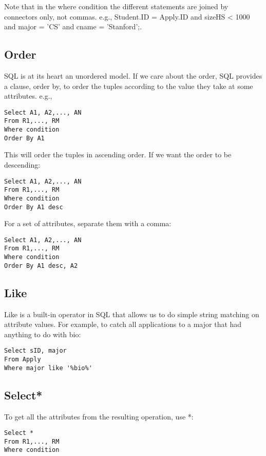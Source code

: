 \documentclass[11pt, oneside]{article}   	%
\begin{document}
Note that in the where condition the different statements are joined by connectors only, not commas. e.g.,
Student.ID = Apply.ID and sizeHS < 1000 and major = 'CS' and cname = 'Stanford';.

\subsection{Order}

SQL is at its heart an unordered model. If we care about the order, SQL provides a clause, order by, to order the tuples according to the value they take at some attributes. e.g.,

\begin{lstlisting}
Select A1, A2,..., AN
From R1,..., RM
Where condition
Order By A1
\end{lstlisting}

This will order the tuples in ascending order. If we want the order to be descending:

\begin{lstlisting}
Select A1, A2,..., AN
From R1,..., RM
Where condition
Order By A1 desc
\end{lstlisting}

For a set of attributes, separate them with a comma:

\begin{lstlisting}
Select A1, A2,..., AN
From R1,..., RM
Where condition
Order By A1 desc, A2 
\end{lstlisting}

\subsection{Like}

Like is a built-in operator in SQL that allows us to do simple string matching on attribute values. For example, to catch all applications to a major that had anything to do with bio:

\begin{lstlisting}
Select sID, major
From Apply
Where major like '%bio%'
\end{lstlisting}

\subsection{Select*}

To get all the attributes from the resulting operation, use *:

\begin{lstlisting}
Select *
From R1,..., RM
Where condition
\end{lstlisting}
\end{document}
